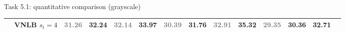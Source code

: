 \documentclass[mathserif, 8pt]{beamer}
\newcommand{\best}[1]{#1}
\newcommand{\bsic}[1]{\textcolor{gray}{#1}}
\newcommand{\Bsic}[1]{\textcolor{gray}{\textbf{#1}}}
\newcommand{\Best}[1]{\textbf{\textcolor{MyOrangeBrighter}{#1}}}
\begin{document}
\begin{frame}{Task 5.1: quantitative comparison (grayscale)}
\begin{center}
{\begin{tabular}{ c | l |c c | c c | c c | c c | c c | c c}
			                      & VNLB   $s_t = 4$     & \Bsic{31.26} &       32.24  & \bsic{32.14} &       33.97   & \Bsic{30.39} &       31.76  & \Bsic{32.91} &      {35.32}  & \bsic{29.35} & \best{30.36} & \Best{32.71} \\\hline
%                                                                                                                                                                                                                      

\end{tabular}}
\end{center}
\end{frame}
\end{document}
